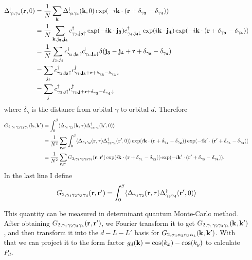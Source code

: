 \documentclass[arXiv, preprint,url,nofootinbib]{revtex4}
\newcommand{\beq}{\begin{equation}}
\newcommand{\eeq}{\end{equation}}
\begin{document}
\beq
\begin{split}
\Delta^{\dagger}_{\gamma_3\gamma_4}({\bf r},0) &=\frac{1}{N}\sum_{\bf k} \Delta^{\dagger}_{\gamma_3\gamma_4}({\bf k},0) \exp(-i {\bf k}\cdot ({\bf r+\delta_{\gamma_3}-\delta_{\gamma_4}})) 
\\& = \frac{1}{N} \sum_{\bf k, j_3,j_4}  c^{\dagger}_{\gamma_3,{\bf j_3 }\uparrow}  \exp(-i {\bf k} \cdot{\bf j_3})  c^{\dagger}_{\gamma_4,{\bf j_4 }\downarrow} \exp(i {\bf k} \cdot{\bf j_4}) \exp(-i {\bf k}\cdot ({\bf r+\delta_{\gamma_3}-\delta_{\gamma_4}})) 
\\& = \frac{1}{N} \sum_{ j_3,j_4}  c^{\dagger}_{\gamma_3,{\bf j_3 }\uparrow}   c^{\dagger}_{\gamma_4,{\bf j_4 }\downarrow} \delta({\bf j_3-j_4+r+\delta_{\gamma_3}-\delta_{\gamma_4}})
\\& = \sum_{ j_3}  c^{\dagger}_{\gamma_3,{\bf j_3 }\uparrow}   c^{\dagger}_{\gamma_4,{\bf j_3+r+\delta_{\gamma_3}-\delta_{\gamma_4}}\downarrow} 
\\& = \sum_{ j}  c^{\dagger}_{\gamma_3,{\bf j }\uparrow}   c^{\dagger}_{\gamma_4,{\bf j+r+\delta_{\gamma_3}-\delta_{\gamma_4}}\downarrow} 
\end{split}
\eeq
where $\delta_\gamma$ is the distance from orbital $\gamma$ to orbital $d$. Therefore 
\beq
\begin{split}
G_{2, \gamma_1 \gamma_2 \gamma_3\gamma_4}({\bf k, k'}) &= \int_0^{\beta} \langle \Delta_{\gamma_1 \gamma_2}({\bf k},\tau)  \Delta^{\dagger}_{\gamma_3 \gamma_4}({\bf k'},0)    \rangle
\\& = \frac{1}{N^2}\sum_{\bf r,r'}  \int_0^{\beta} \langle \Delta_{\gamma_1 \gamma_2}({\bf r},\tau)  \Delta^{\dagger}_{\gamma_3 \gamma_4}({\bf r'},0)    \rangle \exp(i {\bf k}\cdot ({\bf r+\delta_{\gamma_1}-\delta_{\gamma_2}}))  \exp(-i {\bf k'}\cdot ({\bf r'+\delta_{\gamma_3}-\delta_{\gamma_4}})) 
\\&  = \frac{1}{N^2}\sum_{\bf r,r'}  G_{2, \gamma_1 \gamma_2 \gamma_3\gamma_4}({\bf r, r'})  \exp(i {\bf k}\cdot ({\bf r+\delta_{\gamma_1}-\delta_{\gamma_2}}))  \exp(-i {\bf k'}\cdot ({\bf r'+\delta_{\gamma_3}-\delta_{\gamma_4}})).
\end{split}
\eeq
In the last line I define 
\beq
G_{2, \gamma_1 \gamma_2 \gamma_3\gamma_4}({\bf r, r'}) = \int_0^{\beta} \langle \Delta_{\gamma_1 \gamma_2}({\bf r},\tau)  \Delta^{\dagger}_{\gamma_3 \gamma_4}({\bf r'},0)    \rangle
\eeq

This quantity can be measured in determinant quantum Monte-Carlo method. After obtaining $G_{2, \gamma_1 \gamma_2 \gamma_3\gamma_4}({\bf r, r'})$, we Fourier transform it to get $G_{2, \gamma_1 \gamma_2 \gamma_3\gamma_4}({\bf k, k'})$, and then transform it into the $d-L-L'$ basis for $G_{2, \alpha_1 \alpha_2 \alpha_3 \alpha_4}({\bf k, k'})$. With that we can project it to the form factor $g_d({\bf k})=\cos(k_x) - \cos(k_y)$ to calculate $P_d$.
\end{document}
